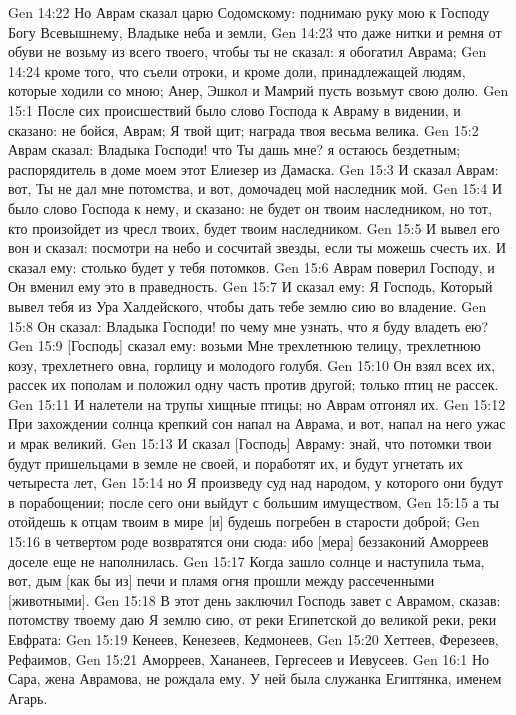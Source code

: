 Gen 14:22  Но Аврам сказал царю Содомскому: поднимаю руку мою к Господу Богу Всевышнему, Владыке неба и земли,
Gen 14:23  что даже нитки и ремня от обуви не возьму из всего твоего, чтобы ты не сказал: я обогатил Аврама;
Gen 14:24  кроме того, что съели отроки, и кроме доли, принадлежащей людям, которые ходили со мною; Анер, Эшкол и Мамрий пусть возьмут свою долю.
Gen 15:1  После сих происшествий было слово Господа к Авраму в видении, и сказано: не бойся, Аврам; Я твой щит; награда твоя весьма велика.
Gen 15:2  Аврам сказал: Владыка Господи! что Ты дашь мне? я остаюсь бездетным; распорядитель в доме моем этот Елиезер из Дамаска.
Gen 15:3  И сказал Аврам: вот, Ты не дал мне потомства, и вот, домочадец мой наследник мой.
Gen 15:4  И было слово Господа к нему, и сказано: не будет он твоим наследником, но тот, кто произойдет из чресл твоих, будет твоим наследником.
Gen 15:5  И вывел его вон и сказал: посмотри на небо и сосчитай звезды, если ты можешь счесть их. И сказал ему: столько будет у тебя потомков.
Gen 15:6  Аврам поверил Господу, и Он вменил ему это в праведность.
Gen 15:7  И сказал ему: Я Господь, Который вывел тебя из Ура Халдейского, чтобы дать тебе землю сию во владение.
Gen 15:8  Он сказал: Владыка Господи! по чему мне узнать, что я буду владеть ею?
Gen 15:9  [Господь] сказал ему: возьми Мне трехлетнюю телицу, трехлетнюю козу, трехлетнего овна, горлицу и молодого голубя.
Gen 15:10  Он взял всех их, рассек их пополам и положил одну часть против другой; только птиц не рассек.
Gen 15:11  И налетели на трупы хищные птицы; но Аврам отгонял их.
Gen 15:12  При захождении солнца крепкий сон напал на Аврама, и вот, напал на него ужас и мрак великий.
Gen 15:13  И сказал [Господь] Авраму: знай, что потомки твои будут пришельцами в земле не своей, и поработят их, и будут угнетать их четыреста лет,
Gen 15:14  но Я произведу суд над народом, у которого они будут в порабощении; после сего они выйдут с большим имуществом,
Gen 15:15  а ты отойдешь к отцам твоим в мире [и] будешь погребен в старости доброй;
Gen 15:16  в четвертом роде возвратятся они сюда: ибо [мера] беззаконий Аморреев доселе еще не наполнилась.
Gen 15:17  Когда зашло солнце и наступила тьма, вот, дым [как бы из] печи и пламя огня прошли между рассеченными [животными].
Gen 15:18  В этот день заключил Господь завет с Аврамом, сказав: потомству твоему даю Я землю сию, от реки Египетской до великой реки, реки Евфрата:
Gen 15:19  Кенеев, Кенезеев, Кедмонеев,
Gen 15:20  Хеттеев, Ферезеев, Рефаимов,
Gen 15:21  Аморреев, Хананеев, Гергесеев и Иевусеев.
Gen 16:1  Но Сара, жена Аврамова, не рождала ему. У ней была служанка Египтянка, именем Агарь.
